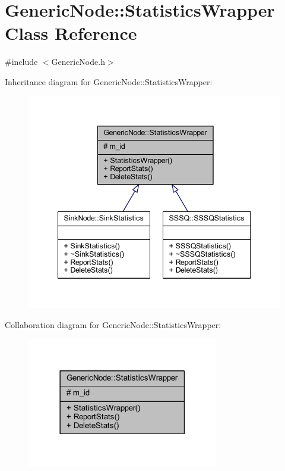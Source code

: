 \hypertarget{class_generic_node_1_1_statistics_wrapper}{}\section{Generic\+Node\+:\+:Statistics\+Wrapper Class Reference}
\label{class_generic_node_1_1_statistics_wrapper}


{\ttfamily \#include $<$Generic\+Node.\+h$>$}



Inheritance diagram for Generic\+Node\+:\+:Statistics\+Wrapper\+:
\nopagebreak
\begin{figure}[H]
\begin{center}
\leavevmode
\includegraphics[width=342pt]{class_generic_node_1_1_statistics_wrapper__inherit__graph}
\end{center}
\end{figure}


Collaboration diagram for Generic\+Node\+:\+:Statistics\+Wrapper\+:
\nopagebreak
\begin{figure}[H]
\begin{center}
\leavevmode
\includegraphics[width=237pt]{class_generic_node_1_1_statistics_wrapper__coll__graph}
\end{center}
\end{figure}
